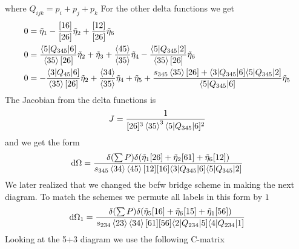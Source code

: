 \documentclass[letter,11pt]{article}
\newcommand{\aMs}[3]{\langle #1|#2|#3]}  		%
\begin{document}
where $Q_{ijk}=p_i+p_j+p_k$
For the other delta functions we get
\begin{equation}
	\begin{aligned}
	 0&=\tilde\eta_1-\frac{[16]}{[26]}\tilde\eta_2+\frac{[12]}{[26]}\tilde\eta_6\\
		0&= \frac{\langle5|Q_{345}|6]}{\expval{35}[26]}\tilde\eta_2+\tilde\eta_3+\frac{\expval{45}}{\expval{35}}\tilde\eta_4-\frac{\langle5|Q_{345}|2]}{\expval{35}[26]}\tilde\eta_6
		\\
		0&= -\frac{\langle3|Q_{45}|6]}{\expval{35}[26]}\tilde\eta_2+\frac{\expval{34}}{\expval{35}}\tilde\eta_4+\tilde\eta_5+\frac{s_{345}\expval{35}[26]+\langle3|Q_{345}|6]\langle5|Q_{345}|2] }{\langle5|Q_{345}|6]}
\tilde\eta_5
	\end{aligned}
\end{equation}
The Jacobian from the delta functions is
\begin{equation}
	\begin{aligned}
		J=\frac{1}{[26]^3\expval{35}^3\aMs{5}{Q_{345}}{6}^2}
	\end{aligned}
\end{equation}
and we get the form
\begin{equation}
	\begin{aligned}
		\dd \Omega=\frac{\delta(\sum P)\delta(\tilde\eta_1[26]+\tilde\eta_2[61]+\tilde\eta_6[12])}{s_{345}\expval{34}\expval{45}[12][16]\aMs{3}{Q_{345}}{6}\aMs{5}{Q_{345}}{2}}
	\end{aligned}
\end{equation}
We later realized that we changed the bcfw bridge scheme in making the next diagram. To match the schemes we permute all labels in this form by $1$
\begin{equation}
	\begin{aligned}
		\dd \Omega_1=\frac{\delta(\sum P)\delta(\tilde\eta_5[16]+\tilde\eta_6[15]+\tilde\eta_1[56])}{s_{234}\expval{23}\expval{34}[61][56]\aMs{2}{Q_{234}}{5}\aMs{4}{Q_{234}}{1}}
	\end{aligned}
\end{equation}
Looking at the 5+3 diagram we use the following C-matrix
\end{document}
